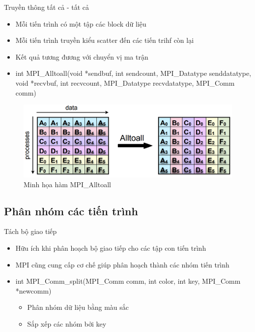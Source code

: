 \documentclass[10pt]{beamer}
\theoremstyle{remark}
\numberwithin{algocf}{section}
\numberwithin{equation}{section}
\numberwithin{dl}{section}
\numberwithin{figure}{section}
\begin{document}
\begin{frame}{Truyền thông tất cả - tất cả}
    \begin{itemize}
        \item Mỗi tiến trình có một tập các block dữ liệu
        \item Mỗi tiến trình truyền kiểu scatter đến các tiến trihf còn lại
        \item Kết quả tương đương với chuyển vị ma trận
        \item int MPI\_Alltoall(void *sendbuf, int sendcount,
                                MPI\_Datatype senddatatype, void *recvbuf,
                                int recvcount, MPI\_Datatype recvdatatype,
                                MPI\_Comm comm) 
    \end{itemize}

    \begin{figure}[H]
        \centering
        \includegraphics[height=0.35\textheight]{figures/MPI/Alltoall.png}
        \caption{Minh họa hàm MPI\_Alltoall}
    \end{figure}
\end{frame}

\subsection{Phân nhóm các tiến trình}

\begin{frame}{Tách bộ giao tiếp}
    \begin{itemize}
        \item Hữu ích khi phân hoạch bộ giao tiếp cho các tập con tiến trình
        \item MPI cũng cung cấp cơ chế giúp phân hoạch thành các nhóm tiến trình
        \item int MPI\_Comm\_split(MPI\_Comm comm, int color, int key,
                                   MPI\_Comm *newcomm)
        \begin{itemize}
            \item Phân nhóm dữ liệu bằng màu sắc
            \item Sắp xếp các nhóm bởi key
        \end{itemize}
    \end{itemize}
\end{frame}
\end{document}
